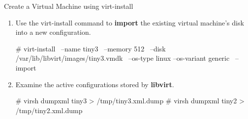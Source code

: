 \begin{Lab}
\begin{exe}  {Create a Virtual Machine using virt-install}
\begin{sol}
\begin{enumerate}
				The contents of the 
				 are: 
				\begin{raw}
<network>
  <name>default</name>
  <uuid>96ea6db6-cfb9-48fa-ad6a-bd21ab81c0d3</uuid>
  <forward mode='nat'>
    <nat>
      <port start='1024' end='65535'/>
    </nat>
  </forward>
  <bridge name='virbr0' stp='on' delay='0'/>
  <mac address='52:54:00:95:cb:bd'/>
  <domain name='default'/>
  <ip address='192.168.122.1' netmask='255.255.255.0'>
    <dhcp>
      <range start='192.168.122.128' end='192.168.122.254'/>
    </dhcp>
  </ip>
</network>
				\end{raw}

				Based on the default-net.xml file, the command to 
				define the network is:
				\begin{raw}
# virsh net-define default-net.xml 
Network default defined from default-net.xml
				\end{raw}
				Then set the network to autostart:
				\begin{raw}
# virsh net-autostart default 
Network default marked as autostarted
				\end{raw}
				Verify the network looks good. 
				\begin{raw}
# virsh net-list --all 
 Name                 State      Autostart     Persistent
----------------------------------------------------------
 default              inactive   yes           yes

				\end{raw}
				Start the new network. 
				\begin{raw}
# virsh net-start default
				\end{raw}

		\item  Use the virt-install command to \textbf{import} the existing 
			virtual machine's disk into a new configuration.
			\begin{raw} 
# virt-install \
              --name tiny3 \
              --memory 512 \
              --disk /var/lib/libvirt/images/tiny3.vmdk \
	      --os-type linux --os-variant generic  \
              --import
			\end{raw}
		
		\item 
			Examine the active configurations stored by \textbf{libvirt}. 
			\begin{raw}
# virsh dumpxml tiny3 > /tmp/tiny3.xml.dump
# virsh dumpxml tiny2 > /tmp/tiny2.xml.dump
			\end{raw} 


\end{enumerate}
\end{sol}
\end{exe}
\end{Lab}
